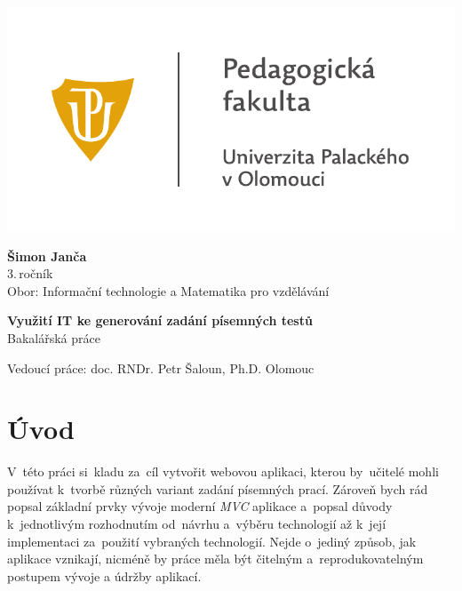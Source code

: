 \documentclass[14pt,a4paper]{article}
\begin{document}
	\begin{titlepage}
		\begin{center}
            {
            \centering
            \includegraphics[]{./PDF_tisk/UP_logo_PdF-UP_horizont_cz.pdf}
            }
			
			\vspace{3cm}

            {
                \LARGE
                \textbf{Šimon Janča}\\
                3.\,ročník\\[8mm]
                Obor: Informační technologie a Matematika pro vzdělávání
            }

            \vspace{4cm}
			
			{
			    \textbf{\Huge Využití IT ke generování zadání písemných testů}\\[4mm]
			    \Large
			    Bakalářská práce
			}

            \vfill
            
            {
                Vedoucí práce:
                doc. RNDr. Petr Šaloun, Ph.D.
                \hfill
    			Olomouc \the\year{}
            }
			
		\end{center}
	\end{titlepage}
	\tableofcontents
	
	\newpage
	
	\section{Úvod}
    V~této práci si~kladu za~cíl vytvořit webovou aplikaci, kterou by~učitelé mohli používat k~tvorbě různých variant zadání písemných prací. Zároveň bych rád popsal základní prvky vývoje moderní \emph{MVC} aplikace a~popsal důvody k~jednotlivým rozhodnutím od~návrhu a~výběru technologií až k~její implementaci za~použití vybraných technologií. Nejde o~jediný způsob, jak aplikace vznikají, nicméně by práce měla být čitelným a~reprodukovatelným postupem vývoje a údržby aplikací.
\end{document}
